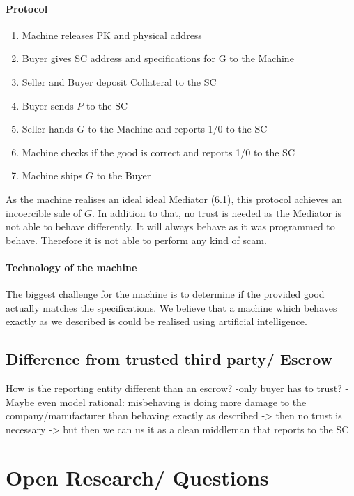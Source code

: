 \documentclass{cacthesis}
\begin{document}
\subsubsection{Protocol}
\begin{enumerate}
    \item Machine releases PK and physical address
    \item Buyer gives SC address and specifications for G to the Machine
    \item Seller and Buyer deposit Collateral to the SC
    \item Buyer sends $P$ to the SC
    \item Seller hands $G$ to the Machine and reports 1/0 to the SC
    \item Machine checks if the good is correct and reports 1/0 to the SC
    \item Machine ships $G$ to the Buyer
\end{enumerate}
As the machine realises an ideal ideal Mediator (6.1), this protocol achieves an incoercible sale of $G$.\newline
In addition to that, no trust is needed as the Mediator is not able to behave differently. It will always behave as it was programmed to behave. Therefore it is not able to perform any kind of scam.

\subsubsection{Technology of the machine}
The biggest challenge for the machine is to determine if the provided good actually matches the specifications.\newline
We believe that a machine which behaves exactly as we described is could be realised using artificial intelligence. 
\section{Difference from trusted third party/ Escrow}
How is the reporting entity different than an escrow?
-only buyer has to trust?
-Maybe even model rational: misbehaving is doing more damage to the company/manufacturer than behaving exactly as described -> then no trust is necessary -> but then we can us it as a clean middleman that reports to the SC
\chapter{Open Research/ Questions}
\end{document}
